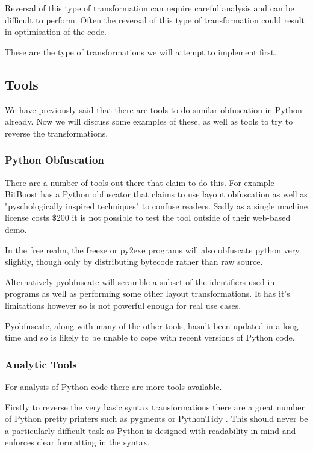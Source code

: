 \documentclass{report}
\begin{document}
Reversal of this type of transformation can require careful analysis and can be difficult to perform. Often the reversal
of this type of transformation could result in optimisation of the code.

These are the type of transformations we will attempt to implement first.

\subsection{Tools}

We have previously said that there are tools to do similar obfuscation in Python already. Now we will discuss some
examples of these, as well as tools to try to reverse the transformations.

\subsubsection{Python Obfuscation}

There are a number of tools out there that claim to do this. For example BitBoost has a Python obfuscator \cite{bitboost}
that claims to use layout obfuscation as well as "pyschologically inspired techniques" to confuse readers. Sadly as a
single machine license costs \$200 it is not possible to test the tool outside of their web-based demo.

In the free realm, the freeze \cite{freezereadme} or py2exe \cite{py2exe} programs will also obfuscate python very slightly,
though only by distributing bytecode rather than raw source.

Alternatively pyobfuscate \cite{pyobf} will scramble a subset of the identifiers used in programs as well as performing
some other layout transformations. It has it's limitations however \cite{pyobf} so is not powerful enough for real use cases.

Pyobfuscate, along with many of the other tools, hasn't been updated in a long time and so is likely to be unable to cope with
recent versions of Python code.

\subsubsection{Analytic Tools}

For analysis of Python code there are more tools available.

Firstly to reverse the very basic syntax transformations there are a great number of Python pretty printers such as
pygments \cite{pygments} or PythonTidy \cite{pythontidy}. This should never be a particularly difficult task as Python is
designed with readability in mind and enforces clear formatting in the syntax.
\end{document}
